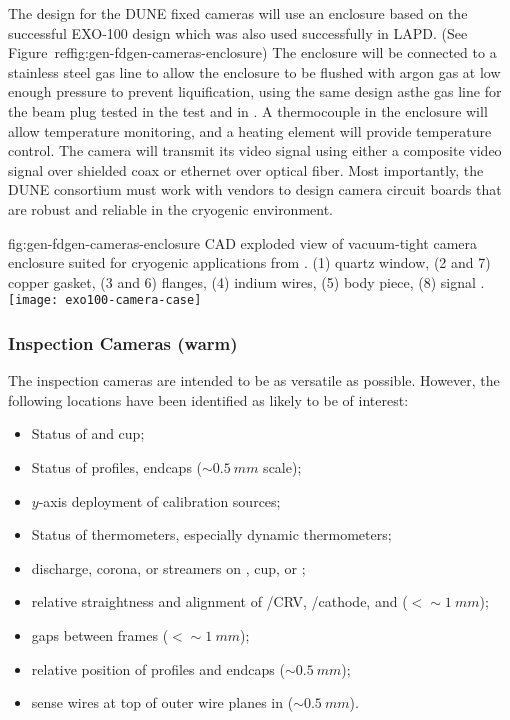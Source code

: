 The design for the DUNE fixed cameras will use an enclosure based on
the successful EXO-100 design\cite{Delaquis:2013hva} which was also
used successfully in
LAPD. (See Figure~ref{fig:gen-fdgen-cameras-enclosure}) The enclosure will
be connected to a stainless steel gas line to allow the enclosure to be
flushed with argon gas at low enough pressure to prevent
liquification, using the same design asthe gas line for the beam plug
tested in the   test and in .  A thermocouple in the
enclosure will allow temperature monitoring, and a heating element
will provide temperature control.  The camera will transmit its video
signal using either a composite video signal over shielded coax or
ethernet over optical fiber.  Most importantly, the DUNE 
consortium must work with vendors to design camera circuit boards that
are robust and reliable in the cryogenic environment.

\begin{dunefigure}{fig:gen-fdgen-cameras-enclosure}
  {CAD exploded view of vacuum-tight camera enclosure suited for cryogenic applications from \cite{Delaquis:2013hva}.
    (1) quartz window, (2 and 7) copper gasket, (3 and 6) flanges, (4) indium wires, (5) body piece, (8) signal \fdth.
  }
  \texttt{[image: exo100-camera-case]}%
\end{dunefigure}



\subsubsection{Inspection Cameras (warm)}

The inspection cameras are intended to be as versatile as possible.
However, the following locations have been identified as likely
to be of interest:
\begin{itemize}
\item Status of  \fdth and cup;
\item Status of profiles, endcaps (\(\sim\SI{0.5}{mm}\) scale);
\item $y$-axis deployment of calibration sources;
\item Status of thermometers, especially dynamic thermometers;
\item {} discharge, corona, or streamers on  \fdth, cup, or ;
\item relative straightness and alignment of /CRV, /cathode, and  (\(<\sim\SI{1}{mm}\));
\item gaps between  frames (\(<\sim\SI{1}{mm}\));
\item relative position of profiles and endcaps (\(\sim\SI{0.5}{mm}\));
\item sense wires at top of outer wire planes in \single {} (\(\sim\SI{0.5}{mm}\)).
\end{itemize}

